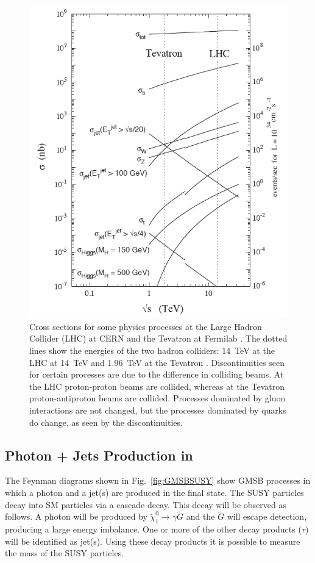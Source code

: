 \begin{figure}[htmb]
 \centering
 \includegraphics[scale=0.55,keepaspectratio=true]{./ParticleCrossSections.png}
 \caption{Cross sections for some physics processes at the Large Hadron Collider (LHC) at CERN \cite{www:LHCPublic} and the Tevatron at Fermilab \cite{www:FNALpublic}. The dotted lines show the energies of the two hadron colliders: 14~TeV at the LHC at 14~TeV and 1.96~TeV at the Tevatron \cite{www:ParticleProductionCrosssections}. Discontinuities seen for certain processes are due to the difference in colliding beams. At the LHC proton-proton beams are collided, whereas at the Tevatron proton-antiproton beams are collided. Processes dominated by gluon interactions are not changed, but the processes dominated by quarks do change, as seen by the discontinuities.}
 \label{fig:ProductionCrosssections}
\end{figure}


\subsection{Photon + Jets Production in \GMSBtext}
The Feynman diagrams shown in Fig.~\ref{fig:GMSBSUSY} show GMSB processes in which a photon and a jet(s) are produced in the final state. The SUSY particles decay into SM particles via a cascade decay. This decay will be observed as follows. A photon will be produced by $\widetilde{\chi}^{0}_{1}\to \gamma\widetilde{G}$ and the $\widetilde{G}$ will escape detection, producing a large energy imbalance. One or more of the other decay products ($\tau$) will be identified as jet(s). Using these decay products it is possible to measure the mass of the SUSY particles.

